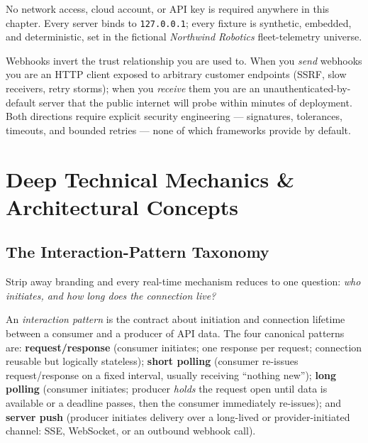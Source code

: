No network access, cloud account, or API key is required anywhere in this
chapter. Every server binds to \texttt{127.0.0.1}; every fixture is
synthetic, embedded, and deterministic, set in the fictional \emph{Northwind
Robotics} fleet-telemetry universe.

\begin{warningbox}
Webhooks invert the trust relationship you are used to. When you \emph{send}
webhooks you are an HTTP client exposed to arbitrary customer endpoints
(SSRF, slow receivers, retry storms); when you \emph{receive} them you are an
unauthenticated-by-default server that the public internet will probe within
minutes of deployment. Both directions require explicit security
engineering --- signatures, tolerances, timeouts, and bounded retries ---
none of which frameworks provide by default.
\end{warningbox}

\section{Deep Technical Mechanics \& Architectural Concepts}
\label{sec:ch11-mechanics}

\subsection{The Interaction-Pattern Taxonomy}
\label{sec:ch11-taxonomy}

Strip away branding and every real-time mechanism reduces to one question:
\emph{who initiates, and how long does the connection live?}

\begin{definition}
An \emph{interaction pattern} is the contract about initiation and connection
lifetime between a consumer and a producer of API data. The four canonical
patterns are: \textbf{request/response} (consumer initiates; one response per
request; connection reusable but logically stateless); \textbf{short polling}
(consumer re-issues request/response on a fixed interval, usually receiving
``nothing new''); \textbf{long polling} (consumer initiates; producer
\emph{holds} the request open until data is available or a deadline passes,
then the consumer immediately re-issues); and \textbf{server push} (producer
initiates delivery over a long-lived or provider-initiated channel: SSE,
WebSocket, or an outbound webhook call).
\end{definition}

